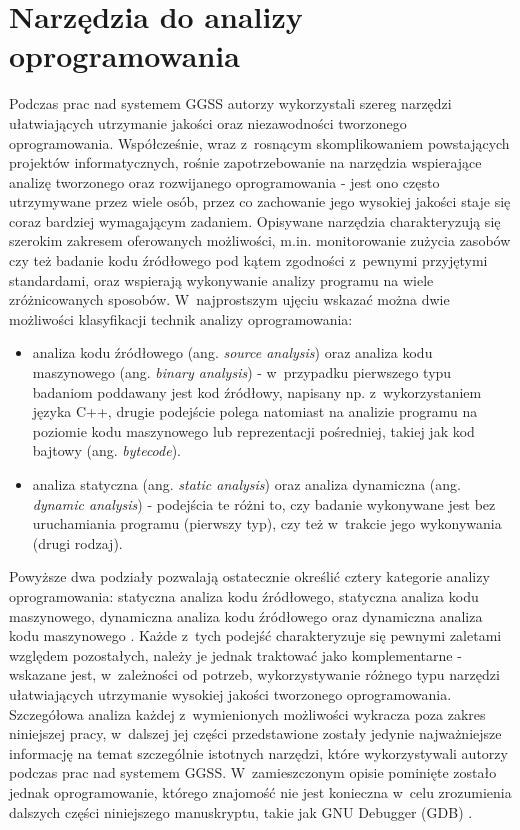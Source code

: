 \section{Narzędzia do analizy oprogramowania}
Podczas prac nad systemem GGSS autorzy wykorzystali szereg narzędzi ułatwiających utrzymanie jakości oraz niezawodności tworzonego oprogramowania. Współcześnie, wraz z~rosnącym skomplikowaniem powstających projektów informatycznych, rośnie zapotrzebowanie na narzędzia wspierające analizę tworzonego oraz rozwijanego oprogramowania - jest ono często utrzymywane przez wiele osób, przez co zachowanie jego wysokiej jakości staje się coraz bardziej wymagającym zadaniem. Opisywane narzędzia charakteryzują się szerokim zakresem oferowanych możliwości, m.in. monitorowanie zużycia zasobów czy też badanie kodu źródłowego pod kątem zgodności z~pewnymi przyjętymi standardami, oraz wspierają wykonywanie analizy programu na wiele zróżnicowanych sposobów. W~najprostszym ujęciu wskazać można dwie możliwości klasyfikacji technik analizy oprogramowania:
\begin{itemize}
    \item analiza kodu źródłowego (ang. \emph{source analysis}) oraz analiza kodu maszynowego (ang. \emph{binary analysis}) - w~przypadku pierwszego typu badaniom poddawany jest kod źródłowy, napisany np. z~wykorzystaniem języka C++, drugie podejście polega natomiast na analizie programu na poziomie kodu maszynowego lub reprezentacji pośredniej, takiej jak kod bajtowy (ang. \emph{bytecode}).
    \item analiza statyczna (ang. \emph{static analysis}) oraz analiza dynamiczna (ang. \emph{dynamic analysis}) - podejścia te różni to, czy badanie wykonywane jest bez uruchamiania programu (pierwszy typ), czy też w~trakcie jego wykonywania (drugi rodzaj).
\end{itemize}

Powyższe dwa podziały pozwalają ostatecznie określić cztery kategorie analizy oprogramowania: statyczna analiza kodu źródłowego, statyczna analiza kodu maszynowego, dynamiczna analiza kodu źródłowego oraz dynamiczna analiza kodu maszynowego \cite{code_analysis}. Każde z~tych podejść charakteryzuje się pewnymi zaletami względem pozostałych, należy je jednak traktować jako komplementarne - wskazane jest, w~zależności od potrzeb, wykorzystywanie różnego typu narzędzi ułatwiających utrzymanie wysokiej jakości tworzonego oprogramowania. Szczegółowa analiza każdej z~wymienionych możliwości wykracza poza zakres niniejszej pracy, w~dalszej jej części przedstawione zostały jedynie najważniejsze informację na temat szczególnie istotnych narzędzi, które wykorzystywali autorzy podczas prac nad systemem GGSS. W~zamieszczonym opisie pominięte zostało jednak oprogramowanie, którego znajomość nie jest konieczna w~celu zrozumienia dalszych części niniejszego manuskryptu, takie jak GNU Debugger (GDB) \cite{gdb}.

